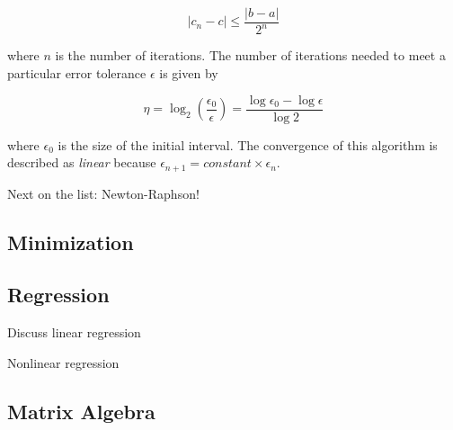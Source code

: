 \begin{equation}
|c_{n} - c| \le \frac{|b-a|}{2^{n}}
\end{equation}

where $n$ is the number of iterations. The number of iterations needed to meet a particular error tolerance $\epsilon$ is given by

\begin{equation}
\eta = \log_{2} (\frac{\epsilon_{0}}{\epsilon}) = \frac{\log \epsilon_{0} - \log \epsilon}{\log 2}
\end{equation}

where $\epsilon_{0}$ is the size of the initial interval. The convergence of this algorithm is described as \textit{linear} because $\epsilon_{n+1} = constant \times \epsilon_{n}$. 

Next on the list: Newton-Raphson!

\subsection{Minimization}

\subsection{Regression}

Discuss linear regression

Nonlinear regression


\subsection{Matrix Algebra}

